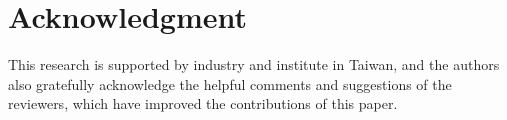 \section*{Acknowledgment}

This research is supported by industry and institute in Taiwan, and the authors also gratefully acknowledge the helpful comments and suggestions of the reviewers, which have improved the contributions of this paper.